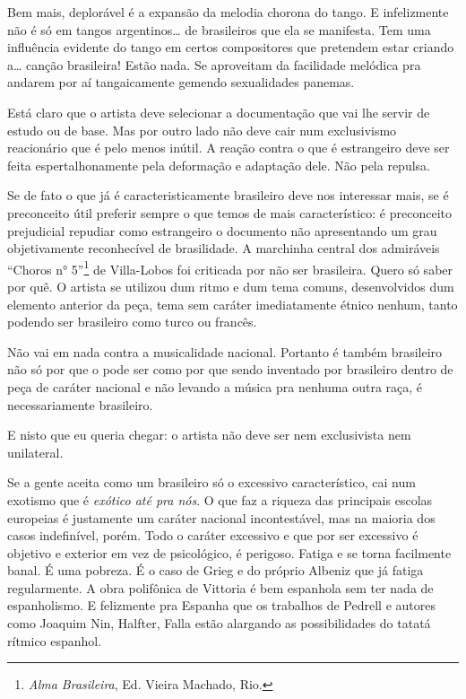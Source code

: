 Bem mais, deplorável é a expansão da melodia chorona do tango. E
infelizmente não é só em tangos argentinos\ldots{} de brasileiros que ela se
manifesta. Tem uma influência evidente do tango em certos compositores
que pretendem estar criando a\ldots{} canção brasileira! Estão nada. Se
aproveitam da facilidade melódica pra andarem por aí tangaicamente
gemendo sexualidades panemas.

Está claro que o artista deve selecionar a documentação que vai lhe
servir de estudo ou de base. Mas por outro lado não deve cair num
exclusivismo reacionário que é pelo menos inútil. A reação contra o que
é estrangeiro deve ser feita espertalhonamente pela deformação e
adaptação dele. Não pela repulsa.

Se de fato o que já é caracteristicamente brasileiro deve nos interessar
mais, se é preconceito útil preferir sempre o que temos de mais
característico: é preconceito prejudicial repudiar como estrangeiro o
documento não apresentando um grau objetivamente reconhecível de
brasilidade. A marchinha central dos admiráveis ``Choros n° 5''\footnote{\textit{Alma Brasileira}, Ed. Vieira Machado, Rio.} de
Villa-Lobos foi criticada por
não ser brasileira. Quero só saber por quê. O artista se utilizou dum
ritmo e dum tema comuns, desenvolvidos dum elemento anterior da peça,
tema sem caráter imediatamente étnico nenhum, tanto podendo ser
brasileiro como turco ou francês.

Não vai em nada contra a musicalidade nacional. Portanto é também
brasileiro não só por que o pode ser como por que sendo inventado por
brasileiro dentro de peça de caráter nacional e não levando a música pra
nenhuma outra raça, é necessariamente brasileiro.

E nisto que eu queria chegar: o artista não deve ser nem exclusivista
nem unilateral.

Se a gente aceita como um brasileiro só o excessivo característico, cai
num exotismo que é \textit{exótico até pra nós}. O que faz a riqueza das
principais escolas europeias é justamente um caráter nacional
incontestável, mas na maioria dos casos indefinível, porém. Todo o
caráter excessivo e que por ser excessivo é objetivo e exterior em vez
de psicológico, é perigoso. Fatiga e se torna facilmente banal. É uma
pobreza. É o caso de Grieg e do próprio Albeniz que já fatiga
regularmente. A obra polifônica de Vittoria é bem espanhola sem ter nada
de espanholismo. E felizmente pra Espanha que os trabalhos de Pedrell e
autores como Joaquim Nin, Halfter, Falla estão alargando as
possibilidades do tatatá rítmico espanhol.

